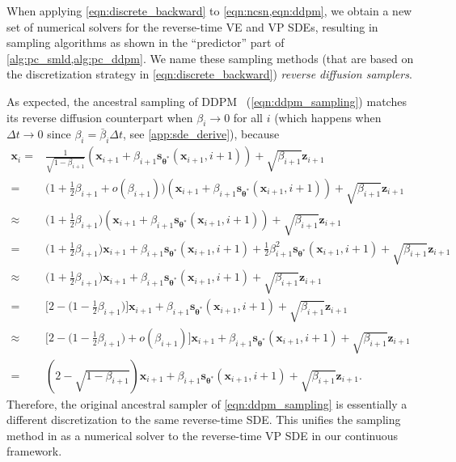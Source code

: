 \documentclass{article} \usepackage{iclr2021_conference,times}
\newcommand{\bfx}{\mathbf{x}}
\newcommand{\bfz}{\mathbf{z}}
\newcommand{\bftheta}{{\boldsymbol{\theta}}}
\newcommand{\bfs}{\mathbf{s}}
\newcommand{\bbeta}{\bar{\beta}}
\begin{document}
When applying \cref{eqn:discrete_backward} to \cref{eqn:ncsn,eqn:ddpm}, we obtain a new set of numerical solvers for the reverse-time VE and VP SDEs, resulting in sampling algorithms as shown in the ``predictor'' part of \cref{alg:pc_smld,alg:pc_ddpm}. We name these sampling methods (that are based on the discretization strategy in \cref{eqn:discrete_backward}) \emph{reverse diffusion samplers}. 

As expected, the ancestral sampling of DDPM~\citep{ho2020denoising} (\cref{eqn:ddpm_sampling}) matches its reverse diffusion counterpart when $\beta_i \to 0$ for all $i$ (which happens when $\Delta t \to 0$ since $\beta_i = \bbeta_i \Delta t$, see \cref{app:sde_derive}), because
\begin{align*}
    \bfx_i = &\frac{1}{\sqrt{1-\beta_{i+1}}}(\bfx_{i+1} + \beta_{i+1} \bfs_{\bftheta^*}(\bfx_{i+1}, i+1)) + \sqrt{\beta_{i+1}} \bfz_{i+1}\\
    =&  \bigg( 1 + \frac{1}{2}\beta_{i+1} + o(\beta_{i+1}) \bigg)(\bfx_{i+1} + \beta_{i+1} \bfs_{\bftheta^*}(\bfx_{i+1}, i+1)) + \sqrt{\beta_{i+1}} \bfz_{i+1}\\
    \approx & \bigg( 1 + \frac{1}{2}\beta_{i+1} \bigg)(\bfx_{i+1} + \beta_{i+1} \bfs_{\bftheta^*}(\bfx_{i+1}, i+1)) + \sqrt{\beta_{i+1}} \bfz_{i+1}\\
    =&\bigg(1 + \frac{1}{2}\beta_{i+1} \bigg) \bfx_{i+1} + \beta_{i+1}\bfs_{\bftheta^*}(\bfx_{i+1}, i+1) + \frac{1}{2}\beta_{i+1}^2 \bfs_{\bftheta^*}(\bfx_{i+1}, i+1) + \sqrt{\beta_{i+1}} \bfz_{i+1}\\
    \approx& \bigg(1 + \frac{1}{2}\beta_{i+1} \bigg) \bfx_{i+1} + \beta_{i+1}\bfs_{\bftheta^*}(\bfx_{i+1}, i+1) + \sqrt{\beta_{i+1}} \bfz_{i+1}\\
    =& \bigg[2 - \bigg(1 - \frac{1}{2}\beta_{i+1}\bigg) \bigg] \bfx_{i+1} + \beta_{i+1}\bfs_{\bftheta^*}(\bfx_{i+1}, i+1) + \sqrt{\beta_{i+1}} \bfz_{i+1}\\
    \approx& \bigg[2 - \bigg(1 - \frac{1}{2}\beta_{i+1}\bigg) + o(\beta_{i+1}) \bigg] \bfx_{i+1} + \beta_{i+1}\bfs_{\bftheta^*}(\bfx_{i+1}, i+1) + \sqrt{\beta_{i+1}} \bfz_{i+1}\\
    =& (2 - \sqrt{1-\beta_{i+1}})\bfx_{i+1} + \beta_{i+1}\bfs_{\bftheta^*}(\bfx_{i+1}, i+1)+ \sqrt{\beta_{i+1}} \bfz_{i+1}.
\end{align*}
Therefore, the original ancestral sampler of \cref{eqn:ddpm_sampling} is essentially a different discretization to the same reverse-time SDE. This unifies the sampling method in \citet{ho2020denoising} as a numerical solver to the reverse-time VP SDE in our continuous framework. 
\end{document}
